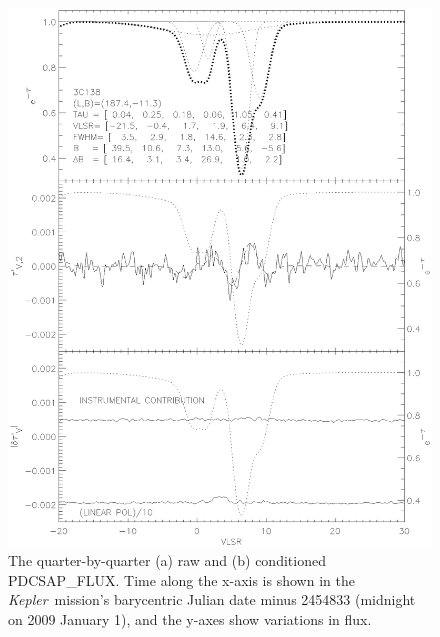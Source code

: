 \documentclass[manuscript]{aastex62}
\newcommand{\kepler}{{\it Kepler}}
\begin{document}
\begin{figure}
\includegraphics[width=\textwidth]{f1.eps}
\caption{The quarter-by-quarter (a) raw and (b) conditioned PDCSAP\_FLUX. Time along the x-axis is shown in the \kepler\ mission's barycentric Julian date minus 2454833 (midnight on 2009 January 1), and the y-axes show variations in flux.\label{fig:raw-conditioned-data_Analysis_of_Kepler76b}}
\end{figure}
\end{document}
